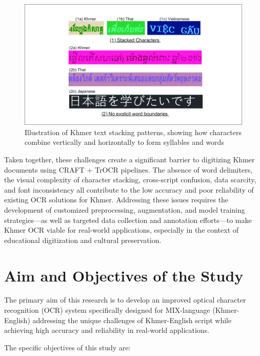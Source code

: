\begin{figure}[ht]
    \centering
    \includegraphics[width=\textwidth]{figures/text_stacking.png}
    \caption{Illustration of Khmer text stacking patterns, showing how characters combine vertically and horizontally to form syllables and words \cite{buoy2023khmerocr}}
    \label{fig:text_stacking}
\end{figure}

Taken together, these challenges create a significant barrier to digitizing Khmer documents using CRAFT + TrOCR pipelines. The absence of word delimiters, the visual complexity of character stacking, cross-script confusion, data scarcity, and font inconsistency all contribute to the low accuracy and poor reliability of existing OCR solutions for Khmer. Addressing these issues requires the development of customized preprocessing, augmentation, and model training strategies—as well as targeted data collection and annotation efforts—to make Khmer OCR viable for real-world applications, especially in the context of educational digitization and cultural preservation.




\section{Aim and Objectives of the Study}
\label{sec:objectives}

The primary aim of this research is to develop an improved optical character recognition (OCR) system specifically designed for MIX-language (Khmer-English) addressing the unique challenges of Khmer-English script while achieving high accuracy and reliability in real-world applications.

The specific objectives of this study are:

